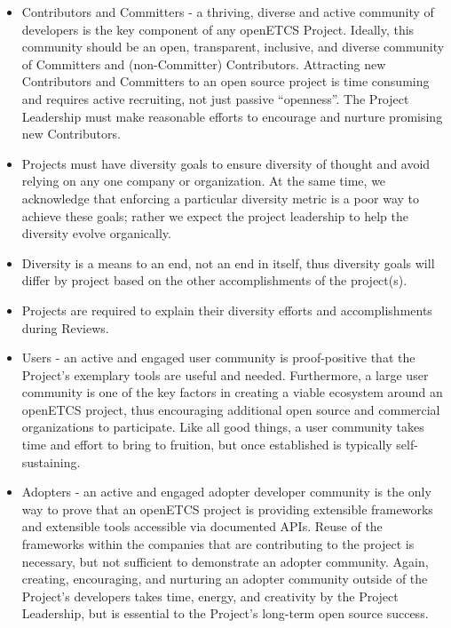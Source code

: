 \begin{itemize}
\item
  Contributors and Committers - a thriving, diverse and active community
  of developers is the key component of any openETCS Project. Ideally,
  this community should be an open, transparent, inclusive, and diverse
  community of Committers and (non-Committer) Contributors. Attracting
  new Contributors and Committers to an open source project is time
  consuming and requires active recruiting, not just passive
  ``openness''. The Project Leadership must make reasonable efforts to
  encourage and nurture promising new Contributors.
\item
  Projects must have diversity goals to ensure diversity of thought and
  avoid relying on any one company or organization. At the same time, we
  acknowledge that enforcing a particular diversity metric is a poor way
  to achieve these goals; rather we expect the project leadership to
  help the diversity evolve organically.
\item
  Diversity is a means to an end, not an end in itself, thus diversity
  goals will differ by project based on the other accomplishments of the
  project(s).
\item
  Projects are required to explain their diversity efforts and
  accomplishments during Reviews.
\item
  Users - an active and engaged user community is proof-positive that
  the Project's exemplary tools are useful and needed. Furthermore, a
  large user community is one of the key factors in creating a viable
  ecosystem around an openETCS project, thus encouraging additional open
  source and commercial organizations to participate. Like all good
  things, a user community takes time and effort to bring to fruition,
  but once established is typically self-sustaining.
\item
  Adopters - an active and engaged adopter developer community is the
  only way to prove that an openETCS project is providing extensible
  frameworks and extensible tools accessible via documented APIs. Reuse
  of the frameworks within the companies that are contributing to the
  project is necessary, but not sufficient to demonstrate an adopter
  community. Again, creating, encouraging, and nurturing an adopter
  community outside of the Project's developers takes time, energy, and
  creativity by the Project Leadership, but is essential to the
  Project's long-term open source success.
\end{itemize}

